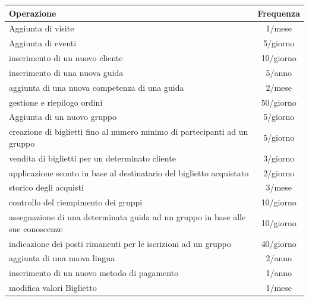 \documentclass[a4paper,12pt]{report}
\begin{document}
\begin{tabularx}{\textwidth}{Xc}
	\toprule
	Operazione                                                                             & Frequenza  \\
	\toprule
	Aggiunta di visite                                                                     & 1/mese     \\
	Aggiunta di eventi                                                                     & 5/giorno   \\
	inserimento di un nuovo cliente                                                        & 10/giorno  \\
	inserimento di una nuova guida                                                         & 5/anno     \\
	aggiunta di una nuova competenza di una guida                                          & 2/mese     \\
	gestione e riepilogo ordini                                                            & 50/giorno  \\
	Aggiunta di un nuovo gruppo                                                            & 5/giorno   \\
	creazione di biglietti fino al numero minimo di partecipanti ad un gruppo              & 5/giorno   \\
	vendita di biglietti per un determinato cliente                                        & 3/giorno   \\
	applicazione sconto in base al destinatario del biglietto acquistato                   & 2/giorno   \\
	storico degli acquisti                                                                 & 3/mese     \\
	controllo del riempimento dei gruppi                                                   & 10/giorno  \\
	assegnazione di una determinata guida ad un gruppo in base alle sue conoscenze         & 10/giorno  \\
	indicazione dei posti rimanenti per le iscrizioni ad un gruppo                         & 40/giorno  \\
	aggiunta di una nuova lingua                                                           & 2/anno     \\
	inserimento di un nuovo metodo di pagamento                                            & 1/anno     \\
	modifica valori Biglietto                                                              & 1/mese     \\

\end{tabularx}
\end{document}
